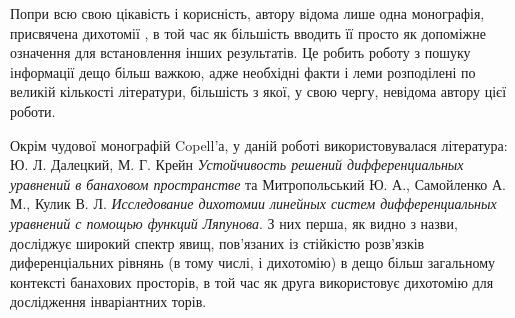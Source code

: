 \documentclass[14pt]{extarticle} %
\theoremstyle{remark}
\begin{document}
Попри всю свою цікавість і корисність, автору відома лише одна монографія, присвячена дихотомії \cite{coppel}, в той час як
більшість вводить її просто як допоміжне
означення для встановлення інших результатів. Це робить роботу з пошуку інформації дещо більш важкою, адже необхідні факти і леми
розподілені по великій кількості літератури, більшість з якої, у свою чергу, невідома автору цієї роботи.

Окрім чудової монографій Copell'а, у
даній роботі використовувалася література: Ю. Л. Далецкий, М. Г. Крейн
\emph{Устойчивость решений дифференциальных уравнений в банаховом пространстве} та Митропольський Ю. А., Самойленко А. М., Кулик В. Л.
\emph{Исследование дихотомии линейных систем дифференциальных уравнений с помощью функций Ляпунова}. З них перша, як видно з назви,
досліджує широкий спектр явищ, пов’язаних із стійкістю розв’язків диференціальних рівнянь (в тому числі, і дихотомію) в дещо
більш загальному контексті банахових просторів, в той час як друга використовує дихотомію для дослідження інваріантних торів.
\end{document}
